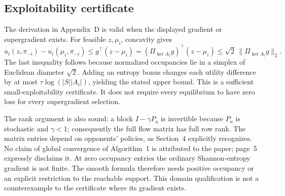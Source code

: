 \documentclass[10pt]{article}
\begin{document}
\subsection*{Exploitability certificate}
The derivation in Appendix D is valid when the displayed gradient or supergradient exists. For feasible \(z,\mu_i\), concavity gives \[u_i(z,\pi_{-i})-u_i(\mu_i,\pi_{-i})
 \leq g^\top(z-\mu_i)
 =(\Pi_{\ker A_i}g)^\top(z-\mu_i)
 \leq\sqrt2\,\|\Pi_{\ker A_i}g\|_2.\] The last inequality follows because normalized occupancies lie in a simplex of Euclidean diameter \(\sqrt2\). Adding an entropy bonus changes each utility difference by at most \(\tau\log(|S||A_i|)\), yielding the stated upper bound. This is a sufficient small-exploitability certificate. It does not require every equilibrium to have zero loss for every supergradient selection.\par
The rank argument is also sound: a block \(I-\gamma P_a\) is invertible because \(P_a\) is stochastic and \(\gamma<1\); consequently the full flow matrix has full row rank. The matrix entries depend on opponents’ policies, as Section 4 explicitly recognizes. No claim of global convergence of Algorithm 1 is attributed to the paper; page 5 expressly disclaims it. At zero occupancy entries the ordinary Shannon-entropy gradient is not finite. The smooth formula therefore needs positive occupancy or an explicit restriction to the reachable support. This domain qualification is not a counterexample to the certificate where its gradient exists.\par
\end{document}
